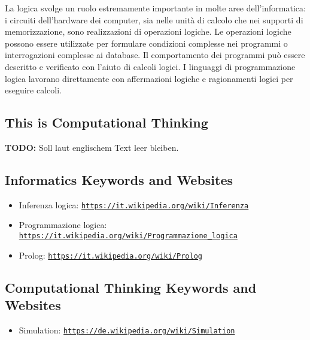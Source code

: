 \documentclass[a4paper,11pt]{report}
\newcommand{\BrochureUrlText}[1]{\texttt{#1}}
\begin{document}
La logica svolge un ruolo estremamente importante in molte aree dell’informatica: i circuiti dell’hardware dei computer, sia nelle unità di calcolo che nei supporti di memorizzazione, sono realizzazioni di operazioni logiche.  Le operazioni logiche possono essere utilizzate per formulare condizioni complesse nei programmi o interrogazioni complesse ai database.  Il comportamento dei programmi può essere descritto e verificato con l’aiuto di calcoli logici.  I linguaggi di programmazione logica lavorano direttamente con affermazioni logiche e ragionamenti logici per eseguire calcoli.


\subsection*{This is Computational Thinking}

\textbf{TODO:} Soll laut englischem Text leer bleiben.


\subsection*{Informatics Keywords and Websites}

\begin{itemize}
  \item Inferenza logica: \href{https://it.wikipedia.org/wiki/Inferenza}{\BrochureUrlText{https://it.wikipedia.org/wiki/Inferenza}}
  \item Programmazione logica: \href{https://it.wikipedia.org/wiki/Programmazione_logica}{\BrochureUrlText{https://it.wikipedia.org/wiki/Programmazione\_logica}}
  \item Prolog: \href{https://it.wikipedia.org/wiki/Prolog}{\BrochureUrlText{https://it.wikipedia.org/wiki/Prolog}}
\end{itemize}


\subsection*{Computational Thinking Keywords and Websites}

\begin{itemize}
  \item Simulation: \href{https://de.wikipedia.org/wiki/Simulation}{\BrochureUrlText{https://de.wikipedia.org/wiki/Simulation}}
\end{itemize}
\end{document}
